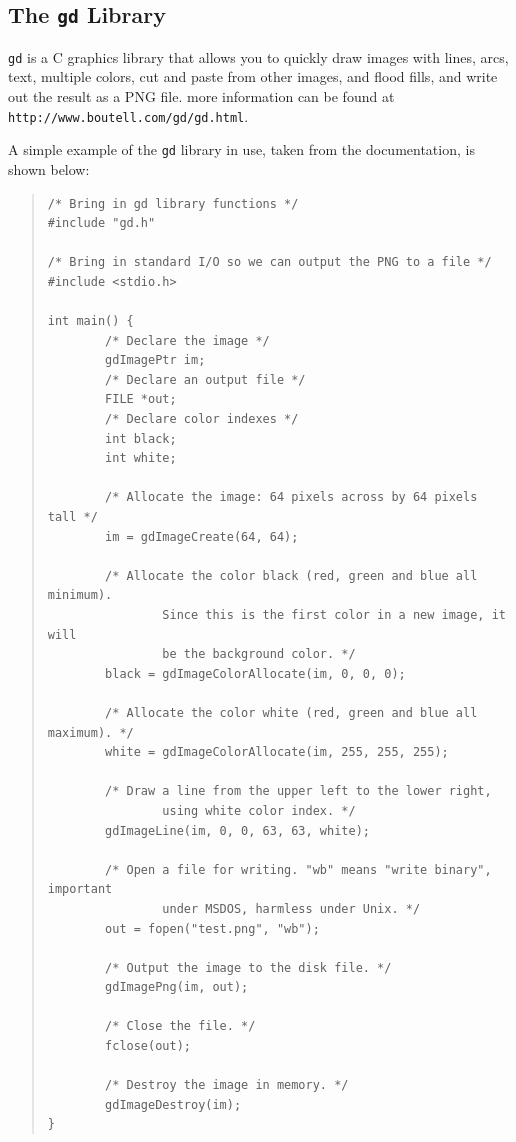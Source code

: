 \documentclass[twoside,11pt]{article}
\newcommand{\htmladdnormallink}[2]{#1}
\newcommand{\htmlref}[2]{#1}
\newcommand{\latex}[1]{#1}
\newcommand{\xlabel}[1]{}
\begin{document}
\subsection{\xlabel{sc15_gd}The {\tt gd} Library\label{sc15_gd}}

\htmladdnormallink{{\tt gd}}{http://www.boutell.com/gd/gd.html} is a C graphics library that allows you to quickly draw images with lines, arcs, text, multiple colors, cut and paste from other images, and flood fills, and write out the result as a \htmlref{PNG}{sc15_libpng} file.\latex{ more information can be found at {\tt http://www.boutell.com/gd/gd.html}.}

A simple example of the {\tt gd} library in use, taken from the documentation, is shown below:

\small
\begin{quote}
\begin{verbatim}
/* Bring in gd library functions */
#include "gd.h"

/* Bring in standard I/O so we can output the PNG to a file */
#include <stdio.h>

int main() {
        /* Declare the image */
        gdImagePtr im;
        /* Declare an output file */
        FILE *out;
        /* Declare color indexes */
        int black;
        int white;

        /* Allocate the image: 64 pixels across by 64 pixels tall */
        im = gdImageCreate(64, 64);

        /* Allocate the color black (red, green and blue all minimum).
                Since this is the first color in a new image, it will
                be the background color. */
        black = gdImageColorAllocate(im, 0, 0, 0);      

        /* Allocate the color white (red, green and blue all maximum). */
        white = gdImageColorAllocate(im, 255, 255, 255);        
        
        /* Draw a line from the upper left to the lower right,
                using white color index. */
        gdImageLine(im, 0, 0, 63, 63, white);   

        /* Open a file for writing. "wb" means "write binary", important
                under MSDOS, harmless under Unix. */
        out = fopen("test.png", "wb");

        /* Output the image to the disk file. */
        gdImagePng(im, out);    

        /* Close the file. */
        fclose(out);

        /* Destroy the image in memory. */
        gdImageDestroy(im);
}
\end{verbatim}
\end{quote}
\normalsize
\end{document}
